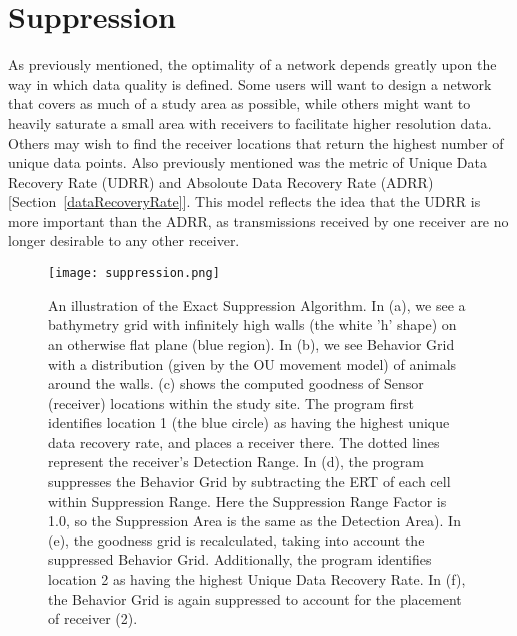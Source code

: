 \section{Suppression}
\label{suppression}
As previously mentioned, the optimality of a network depends greatly upon the way in which data quality is defined.  Some users will want to design a network that covers as much of a study area as possible, while others might want to heavily saturate a small area with receivers to facilitate higher resolution data.  Others may wish to find the receiver locations that return the highest number of unique data points.  Also previously mentioned was the metric of Unique Data Recovery Rate (UDRR) and Absoloute Data Recovery Rate (ADRR) [Section~\ref{dataRecoveryRate}].  This model reflects the idea that the UDRR is more important than the ADRR, as transmissions received by one receiver are no longer desirable to any other receiver.

\begin{figure}[h]
	\label{suppressionImage}
	\centering
	\texttt{[image: suppression.png]}
	\caption{An illustration of the Exact Suppression Algorithm.  In (a), we see a bathymetry grid with infinitely high walls (the white 'h' shape) on an otherwise flat plane (blue region).  In (b), we see Behavior Grid with a distribution (given by the OU movement model) of animals around the walls.  (c) shows the computed goodness of Sensor (receiver) locations within the study site.  The program first identifies location 1 (the blue circle) as having the highest unique data recovery rate, and places a receiver there.  The dotted lines represent the receiver's Detection Range.  In (d), the program suppresses the Behavior Grid by subtracting the ERT of each cell within Suppression Range.  Here the Suppression Range Factor is 1.0, so the Suppression Area is the same as the Detection Area).  In (e), the goodness grid is recalculated, taking into account the suppressed Behavior Grid.  Additionally, the program identifies location 2 as having the highest Unique Data Recovery Rate.  In (f), the Behavior Grid is again suppressed to account for the placement of receiver (2).}
\end{figure}

